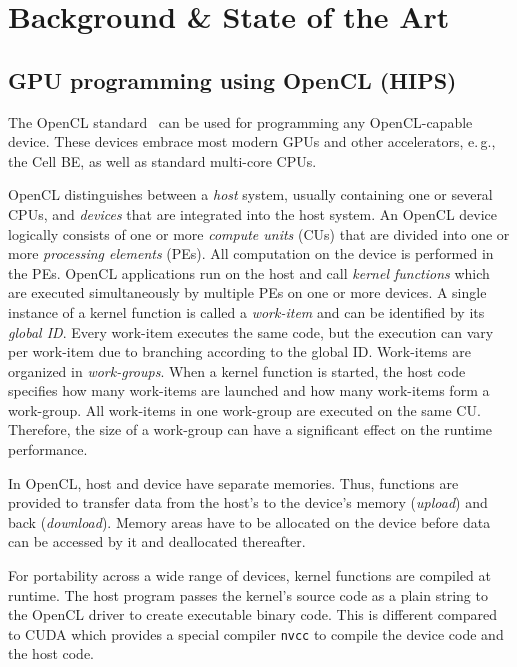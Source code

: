 
\chapter{Background \& State of the Art} %

\label{chapter:background}
\label{chapter:state-of-the-art}

\section{GPU programming using OpenCL (HIPS)}

The OpenCL standard~\cite{OpenCL} can be used for programming any OpenCL-capable device.
These devices embrace most modern GPUs and other accelerators, e.\,g., the Cell BE, as well as standard multi-core CPUs.

OpenCL distinguishes between a \emph{host} system, usually containing one or several CPUs, and \emph{devices} that are integrated into the host system.
An OpenCL device logically consists of one or more \emph{compute units} (CUs) that are divided into one or more \emph{processing elements} (PEs).
All computation on the device is performed in the PEs.
OpenCL applications run on the host and call \emph{kernel functions} which are executed simultaneously by multiple PEs on one or more devices.
A single instance of a kernel function is called a \emph{work-item} and can be identified by its \emph{global ID}.
Every work-item executes the same code, but the execution can vary per work-item due to branching according to the global ID.
Work-items are organized in \emph{work-groups}.
When a kernel function is started, the host code specifies how many work-items are launched and how many work-items form a work-group.
All work-items in one work-group are executed on the same CU.
Therefore, the size of a work-group can have a significant effect on the runtime performance.

In OpenCL, host and device have separate memories.
Thus, functions are provided to transfer data from the host's to the device's memory (\emph{upload}) and back (\emph{download}).
Memory areas have to be allocated on the device before data can be accessed by it and deallocated thereafter.

For portability across a wide range of devices, kernel functions are compiled at runtime.
The host program passes the kernel's source code as a plain string to the OpenCL driver to create executable binary code.
This is different compared to CUDA which provides a special compiler \texttt{nvcc} to compile the device code and the host code.

